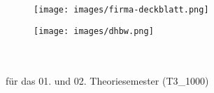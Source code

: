 


\begin{titlepage}

    \centering
    \begin{figure}[t]
        \begin{minipage}[]{0.49\textwidth}
            \begin{flushleft}
                \texttt{[image: images/firma-deckblatt.png]}
            \end{flushleft}
        \end{minipage}
        \begin{minipage}[]{0.49\textwidth}
            \begin{flushright}
                \texttt{[image: images/dhbw.png]}
            \end{flushright}
        \end{minipage}
    \end{figure}

    \enlargethispage{20mm}

    \begin{center}
        \vspace*{6mm}	{\arbeit}\\
        \doublespacing
        \vspace*{12mm}	{\LARGE\textbf{{\titel}}}\\
        \onehalfspacing
        \vspace*{12mm}	für das 01. und 02. Theoriesemester (T3\_1000)\\
        \vspace*{3mm}		\langartikelstudiengang{} \langstudiengang{} \textbf{\studiengang}\\
        \vspace*{3mm}		\langanderdh{} \dhbw\\
        \vspace*{7mm}	\langvon\\
        \vspace*{3mm}		{\large\textbf \autor}\\
        \vspace*{7mm}	\datumAbgabe\\
    \end{center}


\end{titlepage}
